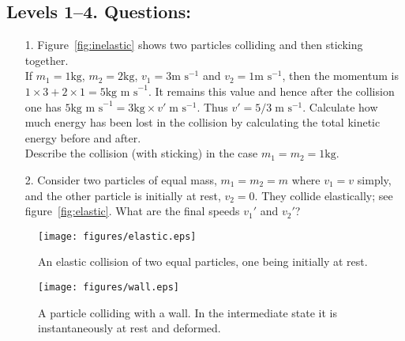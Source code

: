 \subsection*{Levels 1--4.  Questions:}
\begin{itemize}
\item[1.]  Figure~\ref{fig:inelastic} shows two particles colliding and then sticking together.\\
If $m_1 = 1 \textrm{kg}$, $m_2 = 2\textrm{kg}$, $v_1 = 3 \textrm{m s}^{-1}$ and
$v_2 = 1\textrm{m s}^{-1}$, then the momentum is $1 \times 3 + 2 \times 1  = 5 \textrm{kg m s}^{-1}$.
It remains this value and hence after the collision one has $5 \textrm{kg m s}^{-1} = 3 \textrm{kg} \times v' \; \textrm{m s}^{-1}$.  Thus $ v' = 5/3 \; \textrm{m s}^{-1}$.
\nl
Calculate how much energy has been lost in the collision by calculating the total kinetic energy before and after.\\
Describe the collision (with sticking) in the case $m_1 = m_2 = 1\textrm{kg}$.\\

\item[2.]  Consider two particles of equal mass, $m_1 = m_2 = m$ where $v_1 = v$ simply, and the other particle is initially at rest, $v_2=0$.  They collide elastically; see figure~\ref{fig:elastic}.  What are the final speeds $v_1'$ and $v_2'$?

\end{itemize}
\begin{figure}[h!]%
\hspace{1.0cm}
\begin{minipage}{.45\textwidth}
  \centering
  \texttt{[image: figures/elastic.eps]}
  \caption{An elastic collision of two equal particles, one being initially at rest.}
  \label{fig:elastic}
\end{minipage}\hspace{0.2cm}
\begin{minipage}{.45\textwidth}
  \centering
  \texttt{[image: figures/wall.eps]}
  \caption{A particle colliding with a wall.  In the intermediate state it is instantaneously at rest and deformed.}
  \label{fig:wall}
\end{minipage}
\end{figure}

